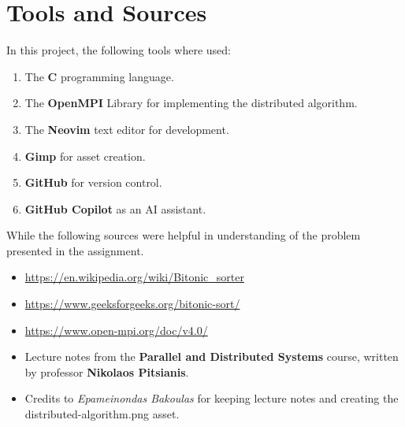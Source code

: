 \documentclass[12pt]{report}
\begin{document}
\chapter{Tools and Sources}
In this project, the following tools where used:
\begin{enumerate}
\item The \textbf{C} programming language.
\item The \textbf{OpenMPI} Library for implementing the distributed algorithm.
\item The \textbf{Neovim} text editor for development.
\item \textbf{Gimp} for asset creation.
\item \textbf{GitHub} for version control.
\item \textbf{GitHub Copilot} as an AI assistant.
\end{enumerate}
While the following sources were helpful in understanding of the problem presented in the assignment.
\begin{itemize}
\item \url{https://en.wikipedia.org/wiki/Bitonic_sorter}
\item \url{https://www.geeksforgeeks.org/bitonic-sort/}
\item \url{https://www.open-mpi.org/doc/v4.0/}
\item Lecture notes from the \textbf{Parallel and Distributed Systems} course, written by professor \textbf{Nikolaos Pitsianis}.
\item Credits to \textit{Epameinondas Bakoulas} for keeping lecture notes and creating the distributed-algorithm.png asset.
\end{itemize}
\end{document}
